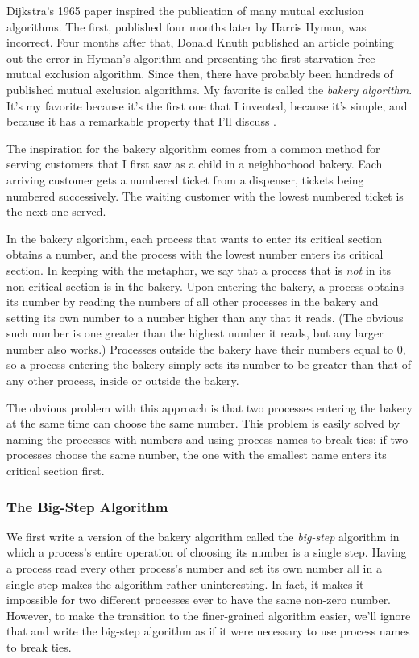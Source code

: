 \documentclass[fleqn,leqno]{article}
\begin{document}
Dijkstra's 1965 paper inspired the publication of many mutual
exclusion algorithms.  The first, published four months later by
Harris 
Hyman, was incorrect.  Four months after that, Donald 
Knuth
published an article pointing out the error in Hyman's algorithm and
presenting the first starvation-free mutual exclusion algorithm.
Since then, there have probably been hundreds of published mutual
exclusion algorithms.  My favorite is called the \emph{bakery
algorithm}.  It's my favorite because it's the first one that I
invented, because it's simple, and because it has a remarkable
property that I'll discuss .

The inspiration for the bakery algorithm comes from a common method
for serving customers that I first saw as a child in a neighborhood
bakery.  Each arriving customer gets a numbered ticket from a
dispenser, tickets being numbered successively.  The waiting customer
with the lowest numbered ticket is the next one served.

In the bakery algorithm, each process that wants to enter its critical
section obtains a number, and the process with the lowest number
enters its critical section.  In keeping with the metaphor, we say
that a process that is \emph{not} in its non-critical section is in
the bakery.  Upon entering the bakery, a process obtains its number by
reading the numbers of all other processes in the bakery and setting
its own number to a number higher than any that it reads.  (The
obvious such number is one greater than the highest number it reads,
but any larger number also works.)  Processes outside the bakery have
their numbers equal to 0, so a process entering the bakery simply sets
its number to be greater than that of any other process, inside or
outside the bakery.

The obvious problem with this approach is that two processes entering
the bakery at the same time can choose the same number.  This problem
is easily solved by naming the processes with numbers and using
process names to break ties: if two processes choose the same number,
the one with the smallest name enters its critical section first.

\subsubsection{The Big-Step Algorithm}

%
We first write a version of the bakery algorithm called the
\emph{big-step} 
algorithm in which a process's entire operation of
choosing its number is a single step.  Having a process read every
other process's number and set its own number all in a single step
makes the algorithm rather uninteresting.  In fact, it makes it
impossible for two different processes ever to have the same non-zero
number.  However, to make the transition to the finer-grained
algorithm easier, we'll ignore that and write the big-step algorithm
as if it were necessary to use process names to break ties.
\end{document}
